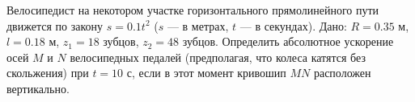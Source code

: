 Велосипедист на некотором участке горизонтального прямолинейного пути
движется по закону $s = 0.1t^2$ ($s$ --- в метрах, $t$ --- в секундах).
Дано: $R = 0.35$ м, $l = 0.18$ м, $z_1 = 18$ зубцов, $z_2 = 48$ зубцов.
Определить абсолютное ускорение осей $M$ и $N$ велосипедных педалей
(предполагая, что колеса катятся без скольжения) при $t = 10$ с,
если в этот момент кривошип $MN$ расположен вертикально.

